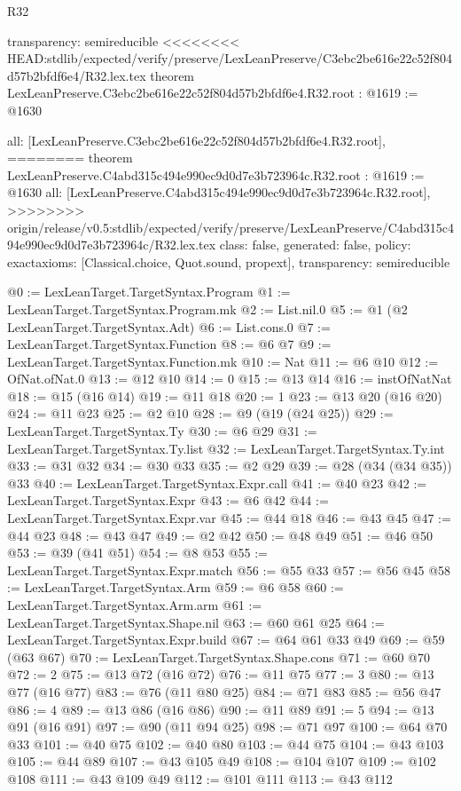 \begin{lexlean}{R32}
\begin{coremodule}
{{{{{{{{{{{{  transparency: semireducible
}
<<<<<<<< HEAD:stdlib/expected/verify/preserve/LexLeanPreserve/C3ebc2be616e22c52f804d57b2bfdf6e4/R32.lex.tex
theorem LexLeanPreserve.C3ebc2be616e22c52f804d57b2bfdf6e4.R32.root : @1619 := @1630 {
  all: [LexLeanPreserve.C3ebc2be616e22c52f804d57b2bfdf6e4.R32.root],
========
theorem LexLeanPreserve.C4abd315c494e990ec9d0d7e3b723964c.R32.root : @1619 := @1630 {
  all: [LexLeanPreserve.C4abd315c494e990ec9d0d7e3b723964c.R32.root],
>>>>>>>> origin/release/v0.5:stdlib/expected/verify/preserve/LexLeanPreserve/C4abd315c494e990ec9d0d7e3b723964c/R32.lex.tex
  class: false,
  generated: false,
  policy: exact{axioms: [Classical.choice, Quot.sound, propext]},
  transparency: semireducible
}

@0 := LexLeanTarget.TargetSyntax.Program
@1 := LexLeanTarget.TargetSyntax.Program.mk
@2 := List.nil.{0}
@5 := @1 (@2 LexLeanTarget.TargetSyntax.Adt)
@6 := List.cons.{0}
@7 := LexLeanTarget.TargetSyntax.Function
@8 := @6 @7
@9 := LexLeanTarget.TargetSyntax.Function.mk
@10 := Nat
@11 := @6 @10
@12 := OfNat.ofNat.{0}
@13 := @12 @10
@14 := 0
@15 := @13 @14
@16 := instOfNatNat
@18 := @15 (@16 @14)
@19 := @11 @18
@20 := 1
@23 := @13 @20 (@16 @20)
@24 := @11 @23
@25 := @2 @10
@28 := @9 (@19 (@24 @25))
@29 := LexLeanTarget.TargetSyntax.Ty
@30 := @6 @29
@31 := LexLeanTarget.TargetSyntax.Ty.list
@32 := LexLeanTarget.TargetSyntax.Ty.int
@33 := @31 @32
@34 := @30 @33
@35 := @2 @29
@39 := @28 (@34 (@34 @35)) @33
@40 := LexLeanTarget.TargetSyntax.Expr.call
@41 := @40 @23
@42 := LexLeanTarget.TargetSyntax.Expr
@43 := @6 @42
@44 := LexLeanTarget.TargetSyntax.Expr.var
@45 := @44 @18
@46 := @43 @45
@47 := @44 @23
@48 := @43 @47
@49 := @2 @42
@50 := @48 @49
@51 := @46 @50
@53 := @39 (@41 @51)
@54 := @8 @53
@55 := LexLeanTarget.TargetSyntax.Expr.match
@56 := @55 @33
@57 := @56 @45
@58 := LexLeanTarget.TargetSyntax.Arm
@59 := @6 @58
@60 := LexLeanTarget.TargetSyntax.Arm.arm
@61 := LexLeanTarget.TargetSyntax.Shape.nil
@63 := @60 @61 @25
@64 := LexLeanTarget.TargetSyntax.Expr.build
@67 := @64 @61 @33 @49
@69 := @59 (@63 @67)
@70 := LexLeanTarget.TargetSyntax.Shape.cons
@71 := @60 @70
@72 := 2
@75 := @13 @72 (@16 @72)
@76 := @11 @75
@77 := 3
@80 := @13 @77 (@16 @77)
@83 := @76 (@11 @80 @25)
@84 := @71 @83
@85 := @56 @47
@86 := 4
@89 := @13 @86 (@16 @86)
@90 := @11 @89
@91 := 5
@94 := @13 @91 (@16 @91)
@97 := @90 (@11 @94 @25)
@98 := @71 @97
@100 := @64 @70 @33
@101 := @40 @75
@102 := @40 @80
@103 := @44 @75
@104 := @43 @103
@105 := @44 @89
@107 := @43 @105 @49
@108 := @104 @107
@109 := @102 @108
@111 := @43 @109 @49
@112 := @101 @111
@113 := @43 @112
}}}}}}}}}}}}
\end{coremodule}
\end{lexlean}
